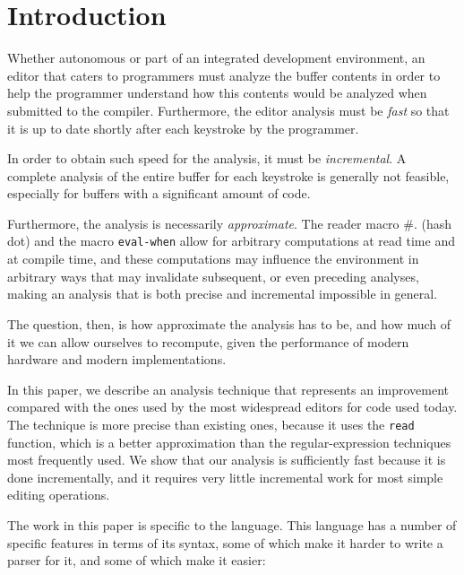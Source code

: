 \section{Introduction}

Whether autonomous or part of an integrated development environment,
an editor that caters to \commonlisp{} programmers must analyze the
buffer contents in order to help the programmer understand how this
contents would be analyzed when submitted to the \commonlisp{}
compiler.  Furthermore, the editor analysis must be \emph{fast} so
that it is up to date shortly after each keystroke by the programmer.

In order to obtain such speed for the analysis, it must be
\emph{incremental}.  A complete analysis of the entire buffer for each
keystroke is generally not feasible, especially for buffers with a
significant amount of code.

Furthermore, the analysis is necessarily \emph{approximate}.  The
reader macro \#. (hash dot) and the macro \texttt{eval-when} allow for
arbitrary computations at read time and at compile time, and these
computations may influence the environment in arbitrary ways that may
invalidate subsequent, or even preceding analyses, making an analysis
that is both precise and incremental impossible in general.

The question, then, is how approximate the analysis has to be, and how
much of it we can allow ourselves to recompute, given the performance
of modern hardware and modern \commonlisp{} implementations.

In this paper, we describe an analysis technique that represents an
improvement compared with the ones used by the most widespread editors
for \commonlisp{} code used today.  The technique is more precise than
existing ones, because it uses the \commonlisp{} \texttt{read}
function, which is a better approximation than the regular-expression
techniques most frequently used.  We show that our analysis is
sufficiently fast because it is done incrementally, and it requires
very little incremental work for most simple editing operations.

The work in this paper is specific to the \commonlisp{} language.
This language has a number of specific features in terms of its
syntax, some of which make it harder to write a parser for it, and
some of which make it easier:


